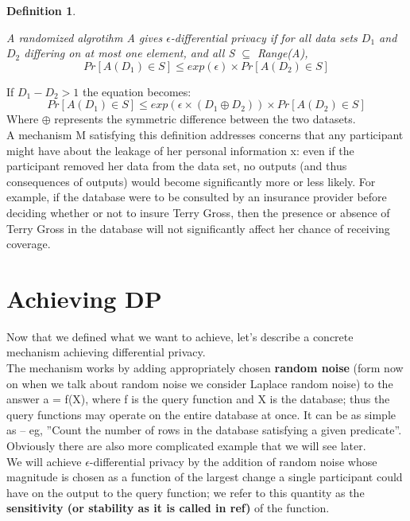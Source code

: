 \documentclass{article}
\newtheorem{defn}[thm]{Definition}
\newenvironment{definition}{\begin{defn}\begin{em}}%
{\end{em}\end{defn}}
\begin{document}
\begin{definition}
A randomized algrotihm A gives $\epsilon$-differential privacy if for all
data sets $D_1$ and $D_2$ differing on at most one element, and all S $\subseteq$ Range(A),
\begin{equation}
Pr[A(D_1) \in S] \leq exp(\epsilon) \times Pr[A(D_2) \in S]
\end{equation}
\end{definition}

If $D_1 - D_2 > 1$ the equation becomes:
\begin{equation}
Pr[A(D_1) \in S] \leq exp(\epsilon \times (D_1 \oplus D_2) ) \times Pr[A(D_2) \in S]
\end{equation}
Where $\oplus$ represents the symmetric difference between the two datasets.\\
A mechanism M satisfying this definition addresses concerns that any participant
might have about the leakage of her personal information x: even if the participant
removed her data from the data set, no outputs (and thus consequences
of outputs) would become significantly more or less likely. For example, if the
database were to be consulted by an insurance provider before deciding whether
or not to insure Terry Gross, then the presence or absence of Terry Gross in the
database will not significantly affect her chance of receiving coverage.


\section{Achieving DP}
Now that we defined what we want to achieve, let's describe a concrete mechanism achieving differential privacy.\\
The mechanism works by adding appropriately chosen \textbf{random noise} (form now on when we talk about random noise we consider Laplace random noise) to
the answer a = f(X), where f is the query function and X is the database; thus
the query functions may operate on the entire database at once. It can be as simple as
– eg, ''Count the number of rows in the database satisfying a given predicate''. Obviously there are also more complicated example that we will see later.\\

We will achieve $\epsilon$-differential privacy by the addition of random noise whose
magnitude is chosen as a function of the largest change a single participant
could have on the output to the query function; we refer to this quantity as the
\textbf{sensitivity (or stability as it is called in ref)} of the function.
\end{document}
